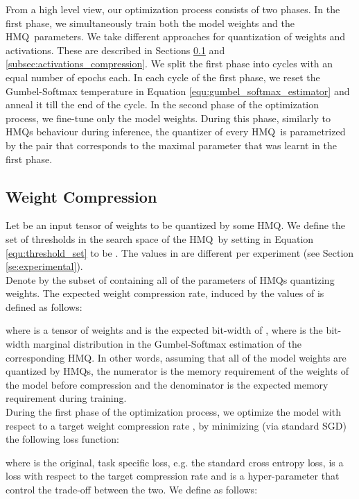 \documentclass{article}
\newcommand{\qb}{HMQ}
\begin{document}
From a high level view, our optimization process consists of two phases.
In the first phase, we simultaneously train both the model weights and the \qb\ parameters.
We take different approaches for quantization of weights and activations.
These are described in Sections \ref{subsec:weight_compression} and \ref{subsec:activations_compression}.
We split the first phase into cycles with an equal number of epochs each.
In each cycle of the first phase, we reset the Gumbel-Softmax temperature  in Equation \ref{equ:gumbel_softmax_estimator} and anneal it till the end of the cycle. 
In the second phase of the optimization process, we fine-tune only the model weights. 
During this phase, similarly to \qb s behaviour during inference, the quantizer of every \qb\ is parametrized by the pair  that corresponds to the maximal parameter  that was learnt in the first phase.






\subsection{Weight Compression}\label{subsec:weight_compression}
Let  be an input tensor of weights to be quantized by some \qb.
We define the set of thresholds  in the search space  of the \qb\ by setting  in Equation \ref{equ:threshold_set} to be .
The values in  are different per experiment (see Section \ref{se:experimental}).\\

Denote by  the subset of  containing all of the parameters of \qb s quantizing weights.
The expected weight compression rate, induced by the values of  is defined as follows:

where  is a tensor of weights and  is the expected bit-width of , where  is the bit-width marginal distribution in the Gumbel-Softmax estimation of the corresponding \qb.
In other words, assuming that all of the model weights are quantized by \qb s, the numerator is the memory requirement of the weights of the model before compression and the denominator is the expected memory requirement during training.\\

During the first phase of the optimization process, we optimize the model with respect to a target weight compression rate , by minimizing (via standard SGD) the following loss function:

where  is the original, task specific loss, e.g. the standard cross entropy loss,  is a loss with respect to the target compression rate  and  is a hyper-parameter that control the trade-off between the two.
We define  as follows:
\end{document}
